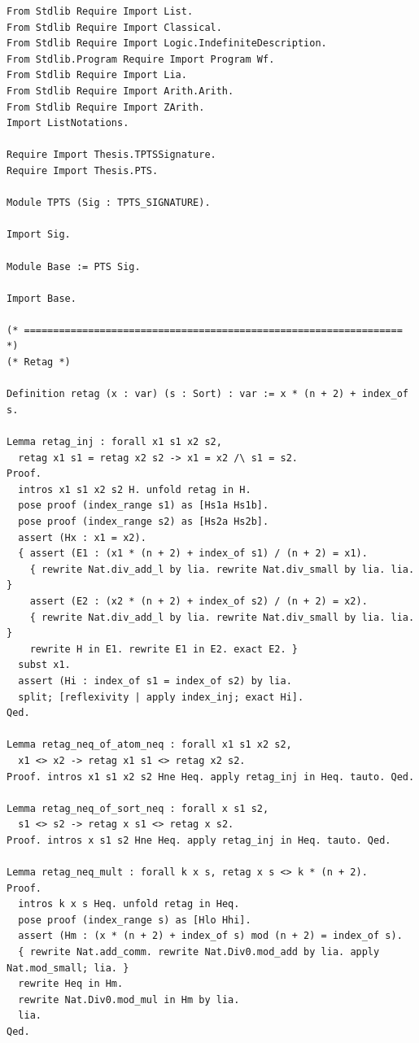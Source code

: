 \begin{latin}
\setmonofont{DejaVu Sans Mono}
\begin{verbatim}
From Stdlib Require Import List.
From Stdlib Require Import Classical.
From Stdlib Require Import Logic.IndefiniteDescription.
From Stdlib.Program Require Import Program Wf.
From Stdlib Require Import Lia.
From Stdlib Require Import Arith.Arith.
From Stdlib Require Import ZArith.
Import ListNotations.

Require Import Thesis.TPTSSignature.
Require Import Thesis.PTS.

Module TPTS (Sig : TPTS_SIGNATURE).

Import Sig.

Module Base := PTS Sig.
  
Import Base.

(* ================================================================= *)
(* Retag *)

Definition retag (x : var) (s : Sort) : var := x * (n + 2) + index_of s.

Lemma retag_inj : forall x1 s1 x2 s2,
  retag x1 s1 = retag x2 s2 -> x1 = x2 /\ s1 = s2.
Proof.
  intros x1 s1 x2 s2 H. unfold retag in H.
  pose proof (index_range s1) as [Hs1a Hs1b].
  pose proof (index_range s2) as [Hs2a Hs2b].
  assert (Hx : x1 = x2).
  { assert (E1 : (x1 * (n + 2) + index_of s1) / (n + 2) = x1).
    { rewrite Nat.div_add_l by lia. rewrite Nat.div_small by lia. lia. }
    assert (E2 : (x2 * (n + 2) + index_of s2) / (n + 2) = x2).
    { rewrite Nat.div_add_l by lia. rewrite Nat.div_small by lia. lia. }
    rewrite H in E1. rewrite E1 in E2. exact E2. }
  subst x1.
  assert (Hi : index_of s1 = index_of s2) by lia.
  split; [reflexivity | apply index_inj; exact Hi].
Qed.

Lemma retag_neq_of_atom_neq : forall x1 s1 x2 s2,
  x1 <> x2 -> retag x1 s1 <> retag x2 s2.
Proof. intros x1 s1 x2 s2 Hne Heq. apply retag_inj in Heq. tauto. Qed.

Lemma retag_neq_of_sort_neq : forall x s1 s2,
  s1 <> s2 -> retag x s1 <> retag x s2.
Proof. intros x s1 s2 Hne Heq. apply retag_inj in Heq. tauto. Qed.

Lemma retag_neq_mult : forall k x s, retag x s <> k * (n + 2).
Proof.
  intros k x s Heq. unfold retag in Heq.
  pose proof (index_range s) as [Hlo Hhi].
  assert (Hm : (x * (n + 2) + index_of s) mod (n + 2) = index_of s).
  { rewrite Nat.add_comm. rewrite Nat.Div0.mod_add by lia. apply Nat.mod_small; lia. }
  rewrite Heq in Hm.
  rewrite Nat.Div0.mod_mul in Hm by lia.
  lia.
Qed.


\end{verbatim}
\end{latin}
